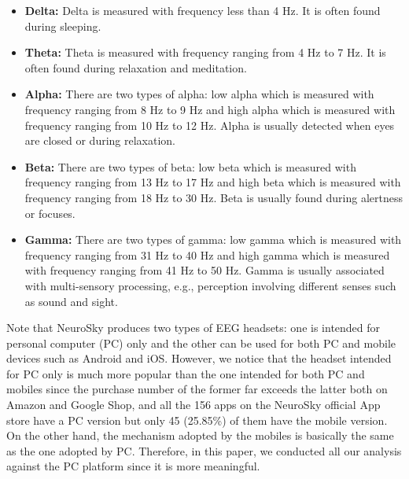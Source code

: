 \begin{itemize}
  \item \textbf{Delta:} Delta is measured with frequency less than 4 Hz. It is often found during sleeping.
  
  \item \textbf{Theta:} Theta is measured with frequency ranging from 4 Hz to 7 Hz. It is often found during relaxation and meditation.
  
  \item \textbf{Alpha:} There are two types of alpha: low alpha which is measured with frequency ranging from 8 Hz to 9 Hz and high alpha which is measured with frequency ranging from 10 Hz to 12 Hz. Alpha is usually detected when eyes are closed or during relaxation.
  
  \item \textbf{Beta:} There are two types of beta: low beta which is measured with frequency ranging from 13 Hz to 17 Hz and high beta which is measured with frequency ranging from 18 Hz to 30 Hz. Beta is usually found during alertness or focuses. 
  
  \item \textbf{Gamma:} There are two types of gamma: low gamma which is measured with frequency ranging from 31 Hz to 40 Hz and high gamma which is measured with frequency ranging from 41 Hz to 50 Hz. Gamma is usually associated with multi-sensory processing, e.g., perception involving different senses such as sound and sight. 
\end{itemize}

Note that NeuroSky produces two types of EEG headsets: one is intended for personal computer (PC) only and the other can be used for both PC and mobile devices such as Android and iOS. However, we notice that the headset intended for PC only is much more popular than the one intended for both PC and mobiles since the purchase number of the former far exceeds the latter both on Amazon and Google Shop, and all the 156 apps on the NeuroSky official App store have a PC version but only 45 (25.85\%) of them have the mobile version. On the other hand, the mechanism adopted by the mobiles is basically the same as the one adopted by PC. Therefore, in this paper, we conducted all our analysis against the PC platform since it is more meaningful.
  
